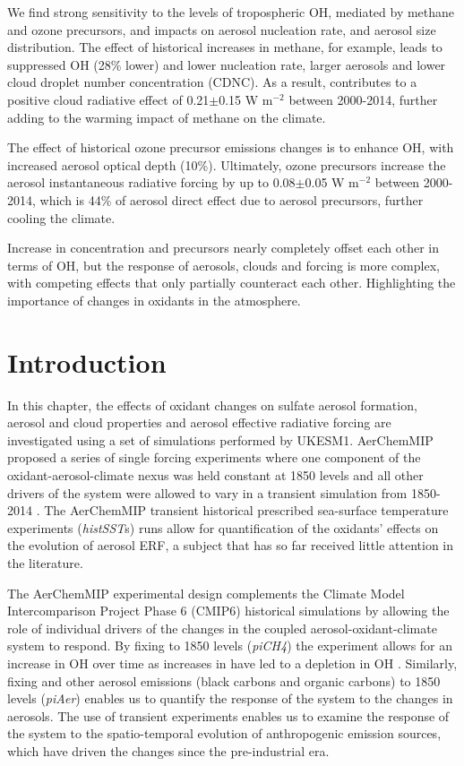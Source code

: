 We find strong sensitivity to the levels of tropospheric OH, mediated by methane and ozone precursors, and impacts on aerosol nucleation rate, and aerosol size distribution. The effect of historical increases in methane, for example, leads to suppressed OH (28\% lower) and lower nucleation rate, larger aerosols and lower cloud droplet number concentration (CDNC). As a result, contributes to a positive cloud radiative effect of 0.21$\pm$0.15 W m$^{-2}$ between 2000-2014, further adding to the warming impact of methane on the climate.

The effect of historical ozone precursor emissions changes is to enhance OH, with increased aerosol optical depth (10\%). Ultimately, ozone precursors increase the aerosol instantaneous radiative forcing by up to 0.08$\pm$0.05 W m$^{-2}$ between 2000-2014, which is 44\% of aerosol direct effect due to aerosol precursors, further cooling the climate.

Increase in  concentration and  precursors nearly completely offset each other in terms of OH, but the response of aerosols, clouds and forcing is more complex, with competing effects that only partially counteract each other. Highlighting the importance of changes in oxidants in the atmosphere.


\section{Introduction}



In this chapter, the effects of oxidant changes on sulfate aerosol formation, aerosol and cloud properties and aerosol effective radiative forcing are investigated using a set of simulations performed by UKESM1. AerChemMIP proposed a series of single forcing experiments where one component of the oxidant-aerosol-climate nexus was held constant at 1850 levels and all other drivers of the system were allowed to vary in a transient simulation from 1850-2014 \citep{collinsAerChemMIPQuantifyingEffects2017}. The AerChemMIP transient historical prescribed sea-surface temperature experiments (\textit{histSST}s) runs allow for quantification of the oxidants' effects on the evolution of aerosol ERF, a subject that has so far received little attention in the literature. 

The AerChemMIP experimental design complements the Climate Model Intercomparison Project Phase 6 (CMIP6) historical simulations by allowing the role of individual drivers of the changes in the coupled aerosol-oxidant-climate system to respond. By fixing  to 1850 levels (\textit{piCH4}) the experiment allows for an increase in OH over time as increases in  have led to a depletion in OH \citep{zhaoRoleTrendVariability2020}. Similarly, fixing  and other aerosol emissions (black carbons and organic carbons) to 1850 levels (\textit{piAer}) enables us to quantify the response of the system to the changes in aerosols. The use of transient experiments enables us to examine the response of the system to the spatio-temporal evolution of anthropogenic emission sources, which have driven the changes since the pre-industrial era. 


